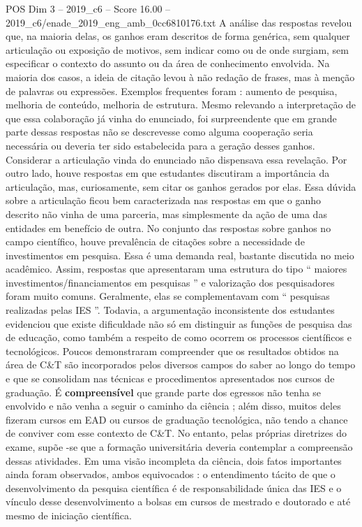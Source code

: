 \begin{textsample}{POS Dim 3 – 2019\_c6 – Score 16.00 – 2019\_c6/enade\_2019\_eng\_amb\_0cc6810176.txt}
A análise das respostas revelou que, na maioria delas, os ganhos eram descritos de forma genérica, sem qualquer articulação ou exposição de motivos, sem indicar como ou de onde surgiam, sem especificar o contexto do assunto ou da área de conhecimento envolvida.
Na maioria dos casos, a ideia de citação levou à não redação de frases, mas à menção de palavras ou expressões.
Exemplos frequentes foram : aumento de pesquisa, melhoria de conteúdo, melhoria de estrutura.
Mesmo relevando a interpretação de que essa colaboração já vinha do enunciado, foi surpreendente que em grande parte dessas respostas não se descrevesse como alguma cooperação seria necessária ou deveria ter sido estabelecida para a geração desses ganhos.
Considerar a articulação vinda do enunciado não dispensava essa revelação.
Por outro lado, houve respostas em que estudantes discutiram a importância da articulação, mas, curiosamente, sem citar os ganhos gerados por elas.
Essa dúvida sobre a articulação ficou bem caracterizada nas respostas em que o ganho descrito não vinha de uma parceria, mas simplesmente da ação de uma das entidades em benefício de outra.
No conjunto das respostas sobre ganhos no campo científico, houve prevalência de citações sobre a necessidade de investimentos em pesquisa.
Essa é uma demanda real, bastante discutida no meio acadêmico.
Assim, respostas que apresentaram uma estrutura do tipo “ maiores investimentos/financiamentos em pesquisas ” e valorização dos pesquisadores foram muito comuns.
Geralmente, elas se complementavam com “ pesquisas realizadas pelas IES ”.
Todavia, a argumentação inconsistente dos estudantes evidenciou que existe dificuldade não só em distinguir as funções de pesquisa das de educação, como também a respeito de como ocorrem os processos científicos e tecnológicos.
Poucos demonstraram compreender que os resultados obtidos na área de C\&T são incorporados pelos diversos campos do saber ao longo do tempo e que se consolidam nas técnicas e procedimentos apresentados nos cursos de graduação.
É \textbf{compreensível} que grande parte dos egressos não tenha se envolvido e não venha a seguir o caminho da ciência ; além disso, muitos deles fizeram cursos em EAD ou cursos de graduação tecnológica, não tendo a chance de conviver com esse contexto de C\&T.
No entanto, pelas próprias diretrizes do exame, supõe -se que a formação universitária deveria contemplar a compreensão dessas atividades.
Em uma visão incompleta da ciência, dois fatos importantes ainda foram observados, ambos equivocados : o entendimento tácito de que o desenvolvimento da pesquisa científica é de responsabilidade única das IES e o vínculo desse desenvolvimento a bolsas em cursos de mestrado e doutorado e até mesmo de iniciação científica.

\end{textsample}
